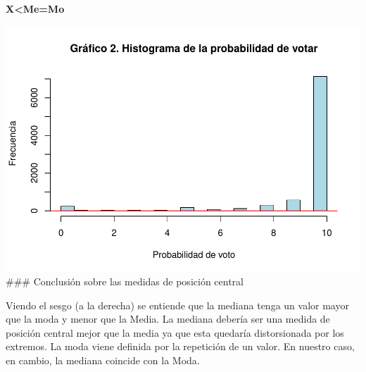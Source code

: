 \documentclass[
  12 pt,
  a4paper,
]{article}
\newenvironment{Shaded}{\begin{snugshade}}{\end{snugshade}}
\newcommand{\AttributeTok}[1]{\textcolor[rgb]{0.13,0.29,0.53}{#1}}
\newcommand{\CommentTok}[1]{\textcolor[rgb]{0.56,0.35,0.01}{\textit{#1}}}
\newcommand{\DecValTok}[1]{\textcolor[rgb]{0.00,0.00,0.81}{#1}}
\newcommand{\FunctionTok}[1]{\textcolor[rgb]{0.13,0.29,0.53}{\textbf{#1}}}
\newcommand{\NormalTok}[1]{#1}
\newcommand{\OtherTok}[1]{\textcolor[rgb]{0.56,0.35,0.01}{#1}}
\newcommand{\SpecialCharTok}[1]{\textcolor[rgb]{0.81,0.36,0.00}{\textbf{#1}}}
\newcommand{\StringTok}[1]{\textcolor[rgb]{0.31,0.60,0.02}{#1}}
\begin{document}
\textbf{X\textless Me=Mo}

\begin{Shaded}
\end{Shaded}

\includegraphics{probabilidadVoto_files/figure-latex/histograma-1.pdf}
\#\#\# Conclusión sobre las medidas de posición central

Viendo el sesgo (a la derecha) se entiende que la mediana tenga un valor
mayor que la moda y menor que la Media. La mediana debería ser una
medida de posición central mejor que la media ya que esta quedaría
distorsionada por los extremos. La moda viene definida por la repetición
de un valor. En nuestro caso, en cambio, la mediana coincide con la
Moda.
\end{document}
